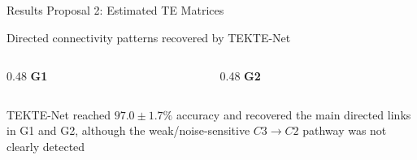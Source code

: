 \documentclass[aspectratio=169]{beamer}
\begin{document}
\begin{frame}{Results Proposal 2: Estimated TE Matrices}

\centering
\large
Directed connectivity patterns recovered by TEKTE-Net

\vspace{0.25cm}

\begin{columns}[T,totalwidth=0.95\textwidth]

\begin{column}{0.48\textwidth}
\centering
\textbf{G1}

\vspace{0.65cm} %

\resizebox{0.62\linewidth}{!}{
    
}
\end{column}

\begin{column}{0.48\textwidth}
\centering
\textbf{G2}

\vspace{0.15cm}

\resizebox{0.70\linewidth}{!}{
    
}
\end{column}

\end{columns}

\vfill

{\color{frameblue}\small
TEKTE-Net reached $97.0\pm1.7\%$ accuracy and recovered the main directed links in G1 and G2, although the weak/noise-sensitive $C3\!\rightarrow\!C2$ pathway was not clearly detected
}

\end{frame}
\end{document}
